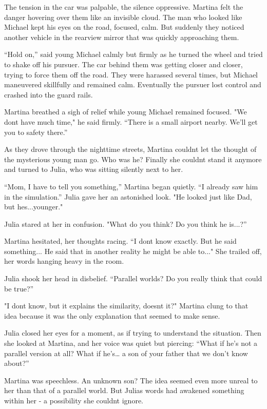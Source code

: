 \documentclass[
]{article}
\begin{document}
The tension in the car was palpable, the silence oppressive. Martina
felt the danger hovering over them like an invisible cloud. The man who
looked like Michael kept his eyes on the road, focused, calm. But
suddenly they noticed another vehicle in the rearview mirror that was
quickly approaching them.

``Hold on,'' said young Michael calmly but firmly as he turned the wheel
and tried to shake off his pursuer. The car behind them was getting
closer and closer, trying to force them off the road. They were harassed
several times, but Michael maneuvered skillfully and remained calm.
Eventually the pursuer lost control and crashed into the guard rails.

Martina breathed a sigh of relief while young Michael remained focused.
"We don\textquotesingle t have much time," he said firmly. ``There is a
small airport nearby. We'll get you to safety there.''

As they drove through the nighttime streets, Martina
couldn\textquotesingle t let the thought of the mysterious young man go.
Who was he? Finally she couldn\textquotesingle t stand it anymore and
turned to Julia, who was sitting silently next to her.

``Mom, I have to tell you something,'' Martina began quietly. ``I
already saw him in the simulation.'' Julia gave her an astonished look.
"He looked just like Dad, but he\textquotesingle s...younger."

Julia stared at her in confusion. "What do you think? Do you think he
is...?''

Martina hesitated, her thoughts racing. ``I don\textquotesingle t know
exactly. But he said something... He said that in another reality he
might be able to..." She trailed off, her words hanging heavy in the
room.

Julia shook her head in disbelief. ``Parallel worlds? Do you really
think that could be true?''

"I don\textquotesingle t know, but it explains the similarity,
doesn\textquotesingle t it?" Martina clung to that idea because it was
the only explanation that seemed to make sense.

Julia closed her eyes for a moment, as if trying to understand the
situation. Then she looked at Martina, and her voice was quiet but
piercing: ``What if he's not a parallel version at all? What if
he's\ldots{} a son of your father that we don't know about?''

Martina was speechless. An unknown son? The idea seemed even more unreal
to her than that of a parallel world. But Julia\textquotesingle s words
had awakened something within her - a possibility she
couldn\textquotesingle t ignore.
\end{document}
